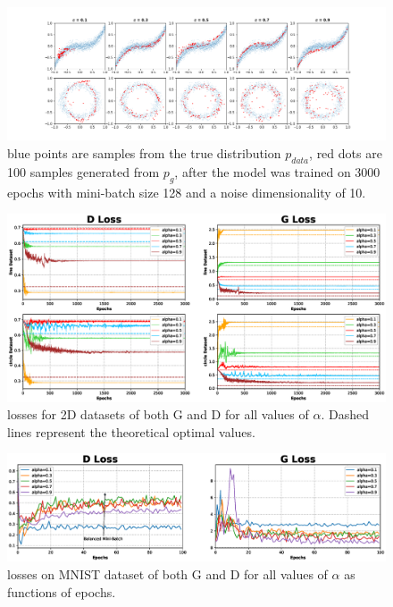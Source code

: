 \begin{figure}
	\includegraphics*[width=\textwidth]{./plots/pdf_2D_fit.png}
	\caption{blue points are samples from the true distribution $p_{data}$, red dots are 100 samples generated from $p_g$, after the model was trained on 3000 epochs with mini-batch size 128 and a noise dimensionality of 10.}
	\label{fig:2Dplots}
\end{figure}
\begin{figure}
	\includegraphics*[width=\textwidth]{./plots/losses_2D.eps}
	\caption{losses for 2D datasets of both G and D for all values of $\alpha$. Dashed lines represent the theoretical optimal values.}
	\label{fig:2Dlosses}
\end{figure}
\begin{figure}
	\includegraphics*[width=\textwidth]{./plots/losses_MNIST.eps}
	\caption{losses on MNIST dataset of both G and D for all values of $\alpha$ as functions of epochs.}
	\label{fig:MNISTlosses}
\end{figure}
